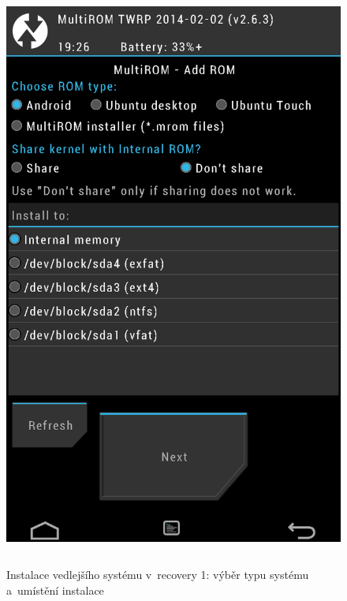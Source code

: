 \documentclass[12pt, a4paper, oneside]{article}
\begin{document}
\begin{figure}[H]
\begin{center}
 \includegraphics[height=550pt]{../img/recovery_install1.png}
\caption{Instalace vedlejšího systému v~recovery 1: výběr typu systému a~umístění instalace}
\end{center}
\end{figure}
\end{document}
